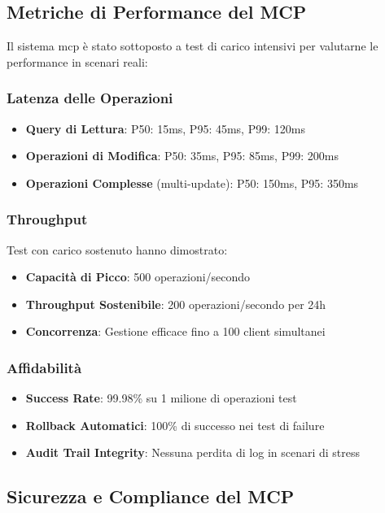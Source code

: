 \subsection{Metriche di Performance del MCP}
\label{subsec:mcp_performance}

Il sistema \gls{mcp} è stato sottoposto a test di carico intensivi per valutarne le performance in scenari reali:

\subsubsection{Latenza delle Operazioni}
\begin{itemize}
    \item \textbf{Query di Lettura}: P50: 15ms, P95: 45ms, P99: 120ms
    \item \textbf{Operazioni di Modifica}: P50: 35ms, P95: 85ms, P99: 200ms
    \item \textbf{Operazioni Complesse} (multi-update): P50: 150ms, P95: 350ms
\end{itemize}

\subsubsection{Throughput}
Test con carico sostenuto hanno dimostrato:
\begin{itemize}
    \item \textbf{Capacità di Picco}: 500 operazioni/secondo
    \item \textbf{Throughput Sostenibile}: 200 operazioni/secondo per 24h
    \item \textbf{Concorrenza}: Gestione efficace fino a 100 client simultanei
\end{itemize}

\subsubsection{Affidabilità}
\begin{itemize}
    \item \textbf{Success Rate}: 99.98\% su 1 milione di operazioni test
    \item \textbf{Rollback Automatici}: 100\% di successo nei test di failure
    \item \textbf{Audit Trail Integrity}: Nessuna perdita di log in scenari di stress
\end{itemize}

\subsection{Sicurezza e Compliance del MCP}
\label{subsec:mcp_security}

